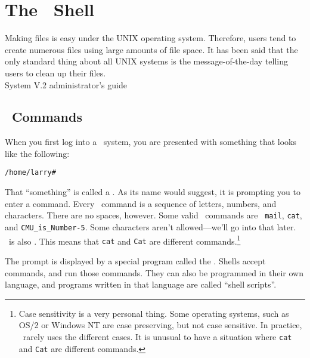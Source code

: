 \chapter{The \unix\ Shell}\label{shell-chapter}

\begin{fortune}
\raggedright
Making files is easy under the UNIX operating system.  Therefore,
users tend to create numerous files using large amounts of file
space.  It has been said that the only standard thing about all UNIX
systems is the message-of-the-day telling users to clean up their
files.\\
\raggedleft System V.2 administrator's guide
\end{fortune}

\section{\unix\ Commands}

When you first log into a \unix\ system, you are presented with
something that looks like the following:

\begin{screen}
\begin{verbatim}
/home/larry#
\end{verbatim}
\end{screen}

That ``something'' is called a .  As its name would
suggest, it is prompting you to enter a command.  Every \unix\ command
is a sequence of letters, numbers, and characters.
There are no spaces, however.  Some valid \unix\ commands are {\tt
  mail}, {\tt cat}, and {\tt CMU\_is\_Number-5}.  Some characters
aren't allowed---we'll go into that later.  \unix\ is also
.  This means that {\tt cat} and {\tt Cat} are
different commands.\footnote{Case sensitivity is a very personal
  thing.  Some operating systems, such as OS/2 or Windows
  NT are case preserving, but not case sensitive.
  In practice, \unix\ rarely uses the different cases.  It is unusual
  to have a situation where {\tt cat} and {\tt Cat} are different
  commands.}

The prompt is displayed by a special program called the
.  Shells accept commands, and run those commands. They
can also be programmed in their own language, and programs written in
that language are called ``shell
scripts''.

